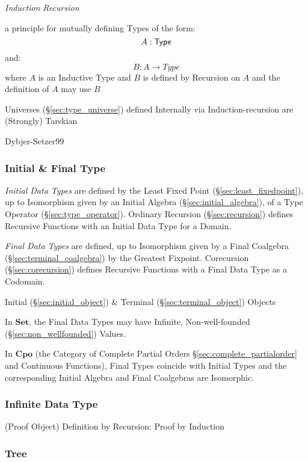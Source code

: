 \emph{Induction Recursion}

a principle for mutually defining Types of the form:
\[
  A : \mathsf{Type}
\]
and:
\[
  B : A \rightarrow Type
\]
where $A$ is an Inductive Type and $B$ is defined by Recursion on $A$
and the definition of $A$ may use $B$

Universes (\S\ref{sec:type_universe}) defined Internally via
Induction-recursion are (Strongly) Tarskian

Dybjer-Setzer99



\subsubsection{Initial \& Final Type}\label{sec:initial_final_type}

\emph{Initial Data Types} are defined by the Least Fixed Point
(\S\ref{sec:least_fixedpoint}), up to Isomorphism given by an Initial
Algebra (\S\ref{sec:initial_algebra}), of a Type Operator
(\S\ref{sec:type_operator}). Ordinary Recursion
(\S\ref{sec:recursion}) defines Recursive Functions with an Initial
Data Type for a Domain.

\emph{Final Data Types} are defined, up to Isomorphism given by a
Final Coalgebra (\S\ref{sec:terminal_coalgebra}) by the Greatest
Fixpoint. Corecursion (\S\ref{sec:corecursion}) defines Recursive
Functions with a Final Data Type as a Codomain.

Initial (\S\ref{sec:initial_object}) \& Terminal
(\S\ref{sec:terminal_object}) Objects

In $\mathbf{Set}$, the Final Data Types may have Infinite,
Non-well-founded (\S\ref{sec:non_wellfounded}) Values.

In $\mathbf{Cpo}$ (the Category of Complete Partial Orders
\S\ref{sec:complete_partialorder} and Continuous Functions), Final
Types coincide with Initial Types and the corresponding Initial
Algebra and Final Coalgebras are Isomorphic.



\subsubsection{Infinite Data Type}\label{sec:infinite_datatype}

(Proof Object) Definition by Recursion: Proof by Induction



\subsubsection{Tree}\label{sec:tree_type}

